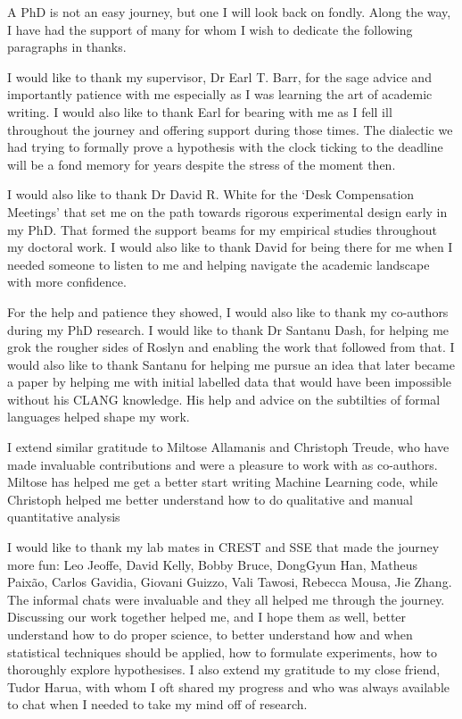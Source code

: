 A PhD is not an easy journey, but one I will look back on fondly. Along the way,
I have had the support of many for whom I wish to dedicate the following
paragraphs in thanks.

I would like to thank my supervisor, Dr Earl T. Barr, for the sage advice and
importantly patience with me especially as I was learning the art of
academic writing. I would also like to thank Earl for bearing with me as I fell
ill throughout the journey and offering support during those times. The
dialectic we had trying to formally prove a hypothesis with the clock ticking to
the deadline will be a fond memory for years despite the stress of the moment
then.

I would also like to thank Dr David R. White for the `Desk Compensation
Meetings' that set me on the path towards rigorous experimental design early in
my PhD. That formed the support beams for my empirical studies throughout my
doctoral work. I would also like to thank David for being there for me when I
needed someone to listen to me and helping navigate the academic landscape with
more confidence.

For the help and patience they showed, I would also like to thank my co-authors
during my PhD research. I would like to thank Dr Santanu Dash, for helping me
grok the rougher sides of Roslyn and enabling the work that followed from that.
I would also like to thank Santanu for helping me pursue an idea that later
became a paper by helping me with initial labelled data that would have been
impossible without his CLANG knowledge. His help and advice on the subtilties of
formal languages helped shape my work.

I extend similar gratitude to Miltose Allamanis and Christoph Treude, who have
made invaluable contributions and were a pleasure to work with as co-authors.
Miltose has helped me get a better start writing Machine Learning code, while
Christoph helped me better understand how to do qualitative and manual
quantitative analysis

I would like to thank my lab mates in CREST and SSE that made the journey more
fun: Leo Jeoffe, David Kelly, Bobby Bruce, DongGyun Han, Matheus Paix\~ao,
Carlos Gavidia, Giovani Guizzo, Vali Tawosi, Rebecca Mousa, Jie Zhang. The
informal chats were invaluable and they all helped me through the journey.
Discussing our work together helped me, and I hope them as well, better
understand how to do proper science, to better understand how and when
statistical techniques should be applied, how to formulate experiments, how to
thoroughly explore hypothesises. I also extend my gratitude to my close friend,
Tudor Harua, with whom I oft shared my progress and who was always
available to chat when I needed to take my mind off of research.

